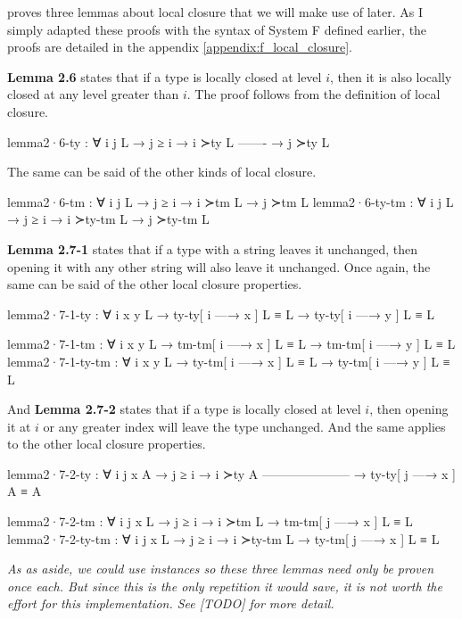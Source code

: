 \documentclass[logo,bsc,singlespacing,parskip,online]{infthesis}
\begin{document}
\citet{pitts_locally_2023} proves three lemmas about local closure that we will make use of later.
As I simply adapted these proofs with the syntax of System F defined earlier, the proofs are
detailed in the appendix \ref{appendix:f_local_closure}.

\textbf{Lemma 2.6} states that if a type is locally closed at level $i$, then it is also locally
closed at any level greater than $i$. The proof follows from the definition of local closure.
\begin{code}
  lemma2·6-ty : ∀ {i j L}
    → j ≥ i
    → i ≻ty L
      -------
    → j ≻ty L
\end{code}
The same can be said of the other kinds of local closure.
\begin{code}
  lemma2·6-tm : ∀ {i j L}
    → j ≥ i → i ≻tm L → j ≻tm L
  lemma2·6-ty-tm : ∀ {i j L}
    → j ≥ i → i ≻ty-tm L → j ≻ty-tm L
\end{code}

\textbf{Lemma 2.7-1} states that if a type with a string leaves it unchanged, then opening it with
any other string will also leave it unchanged. Once again, the same can be said of the other local
closure properties.
\begin{code}
  lemma2·7-1-ty : ∀ {i x y L}
    → ty-ty[ i —→ x ] L ≡ L
    → ty-ty[ i —→ y ] L ≡ L

  lemma2·7-1-tm : ∀ {i x y L}
    → tm-tm[ i —→ x ] L ≡ L → tm-tm[ i —→ y ] L ≡ L
  lemma2·7-1-ty-tm : ∀ {i x y L}
    → ty-tm[ i —→ x ] L ≡ L → ty-tm[ i —→ y ] L ≡ L
\end{code}

And \textbf{Lemma 2.7-2} states that if a type is locally closed at level $i$, then opening it at
$i$ or any greater index will leave the type unchanged. And the same applies to the other local
closure properties.
\begin{code}
  lemma2·7-2-ty : ∀ {i j x A}
    → j ≥ i       → i ≻ty A
      ---------------------
    → ty-ty[ j —→ x ] A ≡ A

  lemma2·7-2-tm : ∀ {i j x L} → j ≥ i
    → i ≻tm L → tm-tm[ j —→ x ] L ≡ L
  lemma2·7-2-ty-tm : ∀ {i j x L} → j ≥ i
    → i ≻ty-tm L → ty-tm[ j —→ x ] L ≡ L
\end{code}

\textit{As as aside, we could use instances so these three lemmas need only be proven once each. But
since this is the only repetition it would save, it is not worth the effort for this implementation.
See [TODO] for more detail.}
\end{document}
